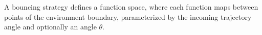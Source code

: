 \documentclass[]{styles/svproc}  %
\begin{document}
A bouncing strategy defines a function space, where each function maps between 
points of the environment boundary, parameterized by the incoming trajectory
angle and optionally an angle $\theta$.

%
\end{document}

